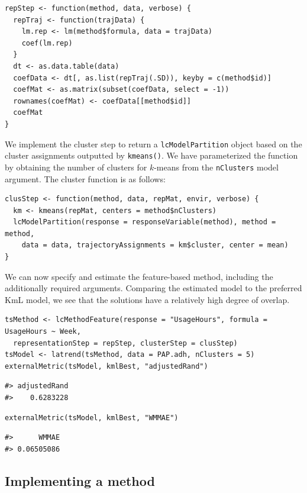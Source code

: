 \begin{verbatim}
repStep <- function(method, data, verbose) {
  repTraj <- function(trajData) {
    lm.rep <- lm(method$formula, data = trajData)
    coef(lm.rep)
  }
  dt <- as.data.table(data)
  coefData <- dt[, as.list(repTraj(.SD)), keyby = c(method$id)]
  coefMat <- as.matrix(subset(coefData, select = -1))
  rownames(coefMat) <- coefData[[method$id]]
  coefMat
}
\end{verbatim}

We implement the cluster step to return a \texttt{lcModelPartition} object based on the cluster assignments outputted by \texttt{kmeans()}. We have parameterized the function by obtaining the number of clusters for \(k\)-means from the \texttt{nClusters} model argument. The cluster function is as follows:

\begin{verbatim}
clusStep <- function(method, data, repMat, envir, verbose) {
  km <- kmeans(repMat, centers = method$nClusters)
  lcModelPartition(response = responseVariable(method), method = method,
    data = data, trajectoryAssignments = km$cluster, center = mean)
}
\end{verbatim}

We can now specify and estimate the feature-based method, including the additionally required arguments. Comparing the estimated model to the preferred KmL model, we see that the solutions have a relatively high degree of overlap.

\begin{verbatim}
tsMethod <- lcMethodFeature(response = "UsageHours", formula = UsageHours ~ Week,
  representationStep = repStep, clusterStep = clusStep)
tsModel <- latrend(tsMethod, data = PAP.adh, nClusters = 5)
externalMetric(tsModel, kmlBest, "adjustedRand")
\end{verbatim}

\begin{verbatim}
#> adjustedRand 
#>    0.6283228
\end{verbatim}

\begin{verbatim}
externalMetric(tsModel, kmlBest, "WMMAE")
\end{verbatim}

\begin{verbatim}
#>      WMMAE 
#> 0.06505086
\end{verbatim}

\subsection{Implementing a method}\label{sec:custommethod}

